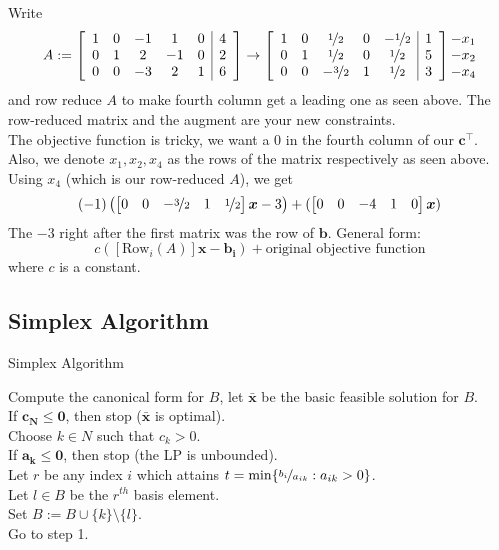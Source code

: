 Write
\[A:=
    \left[\begin{array}{ccccc|c}  
        1 & 0 & -1 & 1 & 0 & 4\\
        0 & 1 & 2 & -1 & 0 & 2\\
        0 & 0 & -3 & 2 & 1 & 6
       \end{array}\right]
    \rightarrow
    \left[\begin{array}{ccccc|c}
        1 & 0 & \nicefrac{1}{2} & 0 & -\nicefrac{1}{2} & 1\\
        0 & 1 & \nicefrac{1}{2} & 0 & \nicefrac{1}{2} & 5\\
        0 & 0 & -\nicefrac{3}{2} & 1 & \nicefrac{1}{2} & 3
    \end{array}\right]
    \begin{matrix}
        -x_1\\
        -x_2\\
        -x_4
    \end{matrix}
\]
and row reduce $A$ to make fourth column get a leading one as seen above.
The row-reduced matrix and the augment are your new constraints.\\
The objective function is tricky, we want a 0 in the fourth column of our $\bm{c}^\top $.
Also, we denote $x_1,x_2,x_4$ as the rows of the matrix respectively as seen above.
Using $x_4$ (which is our row-reduced $A$), we get
\[(-1)\left(
    \begin{bmatrix}
        0 & 0 & -\nicefrac{3}{2} & 1 & \nicefrac{1}{2}
    \end{bmatrix}\bm{x}-3\right)+
    (\begin{bmatrix}
        0 & 0 & -4 & 1 & 0
    \end{bmatrix}\bm{x})
\]
The $-3$ right after the first matrix was the row of $\bm{b}$. General form:
\[ c([\text{Row}_i(A)]\bm{x}-\bm{b_i})+\text{original objective function} \]
where $ c $ is a constant.

\subsection{Simplex Algorithm}
\begin{algorithm}
    \caption{Simplex Algorithm}
    Compute the canonical form for $B$, let $\bm{\bar{x}}$ 
    be the basic feasible solution for $ B $.\\
    If $\bm{c_N}\le \bm{0}$, then stop ($\bm{\bar{x}}$ is optimal).\\
    Choose $k\in N$ such that $c_k>0$.\\
    If $\bm{a_k}\le \bm{0}$, then stop (the LP is unbounded).\\
    Let $r$ be any index $ i $ which attains $t=\min\{\nicefrac{b_i}{a_{ik}} : a_{ik}>0\}$.\\
    Let $l\in B$ be the $r^{th}$ basis element.\\
    Set $B:=B\cup\{k\}\setminus\{l\}$.\\
    Go to step 1.
\end{algorithm}

